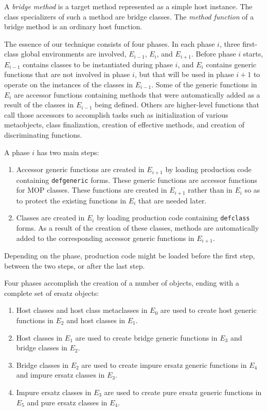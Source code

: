 \begin{definition}
A \emph{bridge method} is a target method represented as a simple host
instance.  The class specializers of such a method are bridge classes.
The \emph{method function} of a bridge method is an ordinary host
function.
\end{definition}

The essence of our technique consists of four phases.  In each phase
$i$, three first-class global environments are involved, $E_{i-1}$,
$E_{i}$, and $E_{i+1}$.  Before phase $i$ starts, $E_{i-1}$ contains
classes to be instantiated during phase $i$, and $E_i$ contains
generic functions that are not involved in phase $i$, but that will be
used in phase $i+1$ to operate on the instances of the classes in
$E_{i-1}$.  Some of the generic functions in $E_i$ are accessor
functions containing methods that were automatically added as a result
of the classes in $E_{i-1}$ being defined.  Others are higher-level
functions that call those accessors to accomplish tasks such as
initialization of various metaobjects, class finalization, creation of
effective methods, and creation of discriminating functions.

A phase $i$ has two main steps:

\begin{enumerate}
\item Accessor generic functions are created in $E_{i+1}$ by loading
  \sicl{} production code containing \texttt{defgeneric} forms.  These
  generic functions are accessor functions for MOP classes.  These
  functions are created in $E_{i+1}$ rather than in $E_i$ so as to
  protect the existing functions in $E_i$ that are needed later.
\item Classes are created in $E_i$ by loading \sicl{} production code
  containing \texttt{defclass} forms.  As a result of the creation of
  these classes, methods are automatically added to the corresponding
  accessor generic functions in $E_{i+1}$.
\end{enumerate}

Depending on the phase, \sicl{} production code might be loaded before
the first step, between the two steps, or after the last step.

Four phases accomplish the creation of a number of objects, ending
with a complete set of ersatz objects:

\begin{enumerate}
\item Host classes and host class metaclasses in $E_0$
  are used to create host generic functions in $E_2$ and host classes
  in $E_1$.
\item Host classes in $E_1$ are used to create bridge
  generic functions in $E_3$ and bridge classes in $E_2$.
\item Bridge classes in $E_2$ are used to create impure
  ersatz generic functions in $E_4$ and impure ersatz classes in
  $E_3$.
\item Impure ersatz classes in $E_3$ are used to create
  pure ersatz generic functions in $E_5$ and pure ersatz classes in
  $E_4$.
\end{enumerate}

